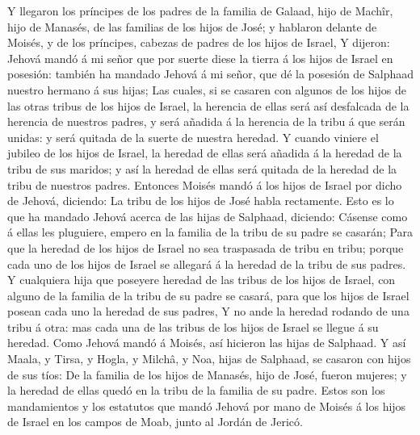  Y llegaron los príncipes de los padres de la familia de
Galaad, hijo de Machîr, hijo de Manasés, de las familias de los hijos de
José; y hablaron delante de Moisés, y de los príncipes, cabezas de
padres de los hijos de Israel,  Y dijeron: Jehová mandó á
mi señor que por suerte diese la tierra á los hijos de Israel en
posesión: también ha mandado Jehová á mi señor, que dé la posesión de
Salphaad nuestro hermano á sus hijas;  Las cuales, si se
casaren con algunos de los hijos de las otras tribus de los hijos de
Israel, la herencia de ellas será así desfalcada de la herencia de
nuestros padres, y será añadida á la herencia de la tribu á que serán
unidas: y será quitada de la suerte de nuestra heredad.  Y
cuando viniere el jubileo de los hijos de Israel, la heredad de ellas
será añadida á la heredad de la tribu de sus maridos; y así la heredad
de ellas será quitada de la heredad de la tribu de nuestros padres.
 Entonces Moisés mandó á los hijos de Israel por dicho de
Jehová, diciendo: La tribu de los hijos de José habla rectamente.
 Esto es lo que ha mandado Jehová acerca de las hijas de
Salphaad, diciendo: Cásense como á ellas les pluguiere, empero en la
familia de la tribu de su padre se casarán;  Para que la
heredad de los hijos de Israel no sea traspasada de tribu en tribu;
porque cada uno de los hijos de Israel se allegará á la heredad de la
tribu de sus padres.  Y cualquiera hija que poseyere
heredad de las tribus de los hijos de Israel, con alguno de la familia
de la tribu de su padre se casará, para que los hijos de Israel posean
cada uno la heredad de sus padres,  Y no ande la heredad
rodando de una tribu á otra: mas cada una de las tribus de los hijos de
Israel se llegue á su heredad.  Como Jehová mandó á
Moisés, así hicieron las hijas de Salphaad.  Y así Maala,
y Tirsa, y Hogla, y Milchâ, y Noa, hijas de Salphaad, se casaron con
hijos de sus tíos:  De la familia de los hijos de
Manasés, hijo de José, fueron mujeres; y la heredad de ellas quedó en la
tribu de la familia de su padre.  Estos son los
mandamientos y los estatutos que mandó Jehová por mano de Moisés á los
hijos de Israel en los campos de Moab, junto al Jordán de Jericó.
